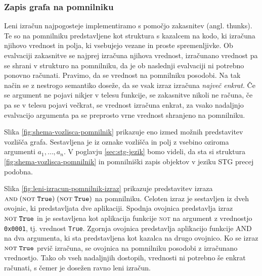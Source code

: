 \subsubsection{Zapis grafa na pomnilniku}

Leni izračun najpogosteje implementiramo s pomočjo zakasnitev (angl. thunks). Te so na pomnilniku predstavljene kot struktura s kazalcem na kodo, ki izračuna njihovo vrednost in polja, ki vsebujejo vezane in proste spremenljivke. Ob evalvaciji zakasnitve se najprej izračuna njihova vrednost, iz\-ra\-ču\-na\-no vrednost pa se shrani v strukturo na pomnilniku, da je ob naslednji evalvaciji ni potrebno ponovno računati. Pravimo, da se vrednost na pomnilniku posodobi. Na tak način se z nestrogo semantiko doseže, da se vsak izraz izračuna \textit{največ enkrat}. Če se argument ne pojavi nikjer v telesu funkcije, se zakasnitve nikoli ne računa, če pa se v telesu pojavi večkrat, se vrednost izračuna enkrat, za vsako nadaljnjo evalvacijo argumenta pa se preprosto vrne vrednost shranjeno na pomnilniku.

Slika \ref{fig:shema-vozlisca-pomnilnik} prikazuje eno izmed možnih predstavitev vozlišča grafa. Sestavljena je iz oznake vozlišča in polj z vsebino oziroma argumenti $a_1, \dots, a_n$. V poglavju \ref{sec:stg-jezik} bomo videli, da sta si struktura \ref{fig:shema-vozlisca-pomnilnik} in pomnilniški zapis objektov v jeziku STG precej podobna.

\begin{figure*}[ht]
	\centering
	\caption{Pomnilniška predstavitev vozlišča grafa}
	\label{fig:shema-vozlisca-pomnilnik}
\end{figure*}

Slika \ref{fig:leni-izracun-pomnilnik-izraz} prikazuje predstavitev izraza $\textsc{and} \; (\textsc{not} \; \texttt{True}) \; (\textsc{not} \; \texttt{True})$ na pomnilniku. Celoten izraz je sestavljen iz dveh ovojnic, ki predstavljata dve aplikaciji. Spodnja ovojnica predstavlja izraz $\textsc{not} \; \texttt{True}$ in je sestavljena kot aplikacija funkcije \textsc{not} na argument z vrednostjo \texttt{0x0001}, tj. vrednost \texttt{True}. Zgornja ovojnica predstavlja aplikacijo funkcije \textsc{AND} na dva argumenta, ki sta predstavljena kot kazalca na drugo ovojnico. Ko se izraz $\textsc{not} \; \texttt{True}$ prvič izračuna, se ovojnica na pomnilniku posodobi z iz\-ra\-ču\-na\-no vrednostjo. Tako ob vseh nadaljnjih dostopih, vrednosti ni potrebno še enkrat računati, s čemer je dosežen ravno leni izračun.

